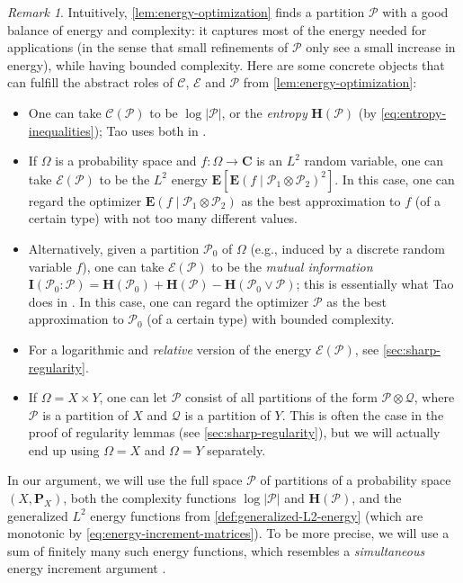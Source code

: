 \documentclass[reqno,11pt]{amsart}
\theoremstyle{definition}
\theoremstyle{remark}
\newtheorem*{remark}{Remark}
\numberwithin{equation}{section}
\newcommand{\C}{\mathbf{C}}
\renewcommand{\P}{\mathbf{P}}
\renewcommand{\H}{\mathbf{H}}
\newcommand{\I}{\mathbf{I}}
\newcommand{\E}{\mathbf{E}}
\newcommand{\mE}{\mathcal{E}}
\newcommand{\mP}{\mathcal{P}}
\newcommand{\mQ}{\mathcal{Q}}
\newcommand{\mC}{\mathcal{C}}
\newcommand{\Energy}{\mE}
\newcommand{\Complexity}{\mC}
\begin{document}
\begin{remark}
Intuitively, \cref{lem:energy-optimization} finds a partition $\mP$ with a good balance of energy and complexity: it captures most of the energy needed for applications (in the sense that small refinements of $\mP$ only see a small increase in energy), while having bounded complexity. Here are some concrete objects that can fulfill the abstract roles of $\Complexity$, $\Energy$ and $\mathscr{P}$ from \cref{lem:energy-optimization}:
\begin{itemize}
    \item One can take $\Complexity(\mP)$ to be $\log |\mP|$, or the \emph{entropy} $\H(\mP)$ (by \cref{eq:entropy-inequalities}); Tao uses both in \cite{tao2005szemer}.
    \item If $\Omega$ is a probability space and $f : \Omega \to \C$ is an $L^2$ random variable, one can take $\Energy(\mP)$ to be the $L^2$ energy $\E[\E(f \mid \mP_1 \otimes \mP_2)^2]$. In this case, one can regard the optimizer $\E(f \mid \mP_1 \otimes \mP_2)$ as the best approximation to $f$ (of a certain type) with not too many different values.
    \item Alternatively, given a partition $\mP_0$ of $\Omega$ (e.g., induced by a discrete random variable $f$), one can take $\Energy(\mP)$ to be the \emph{mutual information} $\I(\mP_0 : \mP) = \H(\mP_0) + \H(\mP) - \H(\mP_0 \vee \mP)$; this is essentially what Tao does in \cite{tao2005szemer}. In this case, one can regard the optimizer $\mP$ as the best approximation to $\mP_0$ (of a certain type) with bounded complexity.
    \item For a logarithmic and \emph{relative} version of the energy $\mE(\mP)$, see \cref{sec:sharp-regularity}.
    \item If $\Omega = X \times Y$, one can let $\mathscr{P}$ consist of all partitions of the form $\mP \otimes \mQ$, where $\mP$ is a partition of $X$ and $\mQ$ is a partition of $Y$. This is often the case in the proof of regularity lemmas (see \cref{sec:sharp-regularity}), but we will actually end up using $\Omega = X$ and $\Omega = Y$ separately. 
\end{itemize}
\end{remark}


In our argument, we will use the full space $\mathscr{P}$ of partitions of a probability space $(X, \P_X)$, both the complexity functions $\log |\mP|$ and $\H(\mP)$, and the generalized $L^2$ energy functions from \cref{def:generalized-L2-energy} (which are monotonic by \cref{eq:energy-increment-matrices}). To be more precise, we will use a sum of finitely many such energy functions, which resembles a \emph{simultaneous} energy increment argument \cite{tao2007ergodic}.
\end{document}
